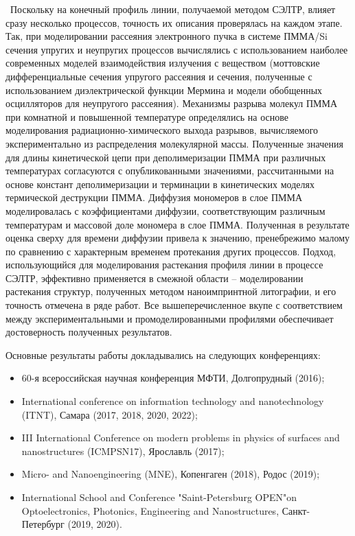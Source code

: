 \probation\
Поскольку на конечный профиль линии, получаемой методом СЭЛТР, влияет сразу несколько процессов, точность их описания проверялась на каждом этапе. Так, при моделировании рассеяния электронного пучка в системе ПММА/Si сечения упругих и неупругих процессов вычислялись с использованием наиболее современных моделей взаимодействия излучения с веществом (моттовские дифференциальные сечения упругого рассеяния и сечения, полученные с использованием диэлектрической функции Мермина и модели обобщенных осцилляторов для неупругого рассеяния). Механизмы разрыва молекул ПММА при комнатной и повышенной температуре определялись на основе моделирования радиационно-химического выхода разрывов, вычисляемого экспериментально из распределения молекулярной массы. Полученные значения для длины кинетической цепи при деполимеризации ПММА при различных температурах согласуются с опубликованными значениями, рассчитанными на основе констант деполимеризации и терминации в кинетических моделях термической деструкции ПММА. Диффузия мономеров в слое ПММА моделировалась с коэффициентами диффузии, соответствующим различным температурам и массовой доле мономера в слое ПММА. Полученная в результате оценка сверху для времени диффузии привела к значению, пренебрежимо малому по сравнению с характерным временем протекания других процессов. Подход, использующийся для моделирования растекания профиля линии в процессе СЭЛТР, эффективно применяется в смежной области – моделировании растекания структур, полученных методом наноимпринтной литографии, и его точность отмечена в ряде работ. Все вышеперечисленное вкупе с соответствием между экспериментальными и промоделированными профилями обеспечивает достоверность полученных результатов.

Основные результаты работы докладывались на следующих конференциях:
\begin{itemize}
	\item 60-я всероссийская научная конференция МФТИ, Долгопрудный (2016);
	\item International conference on information technology and nanotechnology (ITNT), Самара (2017, 2018, 2020, 2022);
	\item III International Conference on modern problems in physics of surfaces and nanostructures (ICMPSN17), Ярославль (2017);
	\item Micro- and Nanoengineering (MNE), Копенгаген (2018), Родос (2019);
	\item International School and Conference "Saint-Petersburg OPEN"on Optoelectronics, Photonics, Engineering and Nanostructures, Санкт-Петербург (2019, 2020).
	
\end{itemize}

